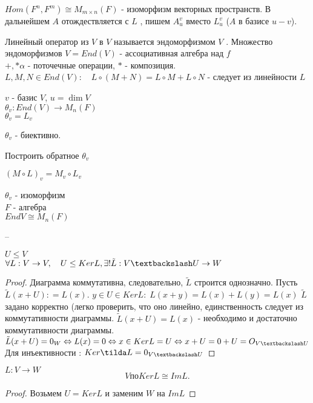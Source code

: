 \documentclass[12pt]{report}
\begin{document}
$Hom (F^n , F^m ) \cong M_{m\times n} (F)$ - изоморфизм векторных пространств.
В дальнейшем $A$ отождествляется с $L$ , пишем $A_u ^v $ вместо $L_u ^v$ ($A$ в базисе $u-v$). 
\begin{defn}
Линейный оператор  из $V $ в  $V$ называется эндоморфизмом $V$ .
Множество эндоморфизмов $V = End(V)$ - ассоциативная алгебра над $f$\\
$+, *\alpha$ - поточечные операции, $*$ - композиция.\\
$L, M, N \in End(V): \quad L\circ (M + N) = L \circ M + L \circ N$ - следует из линейности  $L$
\end{defn}
$v$  - базис $V$, $u = \dim V$ \\
$\theta _v : End(V) \to M_n (F)$ \\
$\theta _v = L_v$
\begin{st}
    $\theta_v$ -  биективно.
\end{st}
\begin{probl}
    Построить обратное $\theta_v$
\end{probl}

\begin{lm}
    $(M \circ L)_v = M_v \circ L_v$
\end{lm}
 \begin{st}
     $\theta _v$ - изоморфизм \\ $F$ - алгебра \\ $End V \cong M_n(F)$
\end{st}

--

\begin{thm}
    $U \le V$ \\
    $\forall L: V \to V, \quad U \le Ker L, \exists ! \tilde L : V \textbackslash U \to W $
\end{thm}
\begin{proof}
    Диаграмма коммутативна, следовательно, $\tilde L$ строится однозначно. Пусть $\tilde L(x + U) : = L(x)$.%
    $y \in U \in Ker L: \; L(x + y) = L(x) + L(y) = L(x)$
    $\tilde L$ задано корректно (легко проверить, что оно линейно, единственность следует из коммутативности диаграммы.
    $\tilde L(x + U) = L(x) $ - необходимо и достаточно коммутативности диаграммы.\\
    $\tilde L(x +U)=0_W \Leftrightarrow L(x) = 0 \Leftrightarrow x \in Ker L = U \Leftrightarrow x + U = 0 +U = O_{V \textbackslash U}$
    \\
    Для инъективности : $ Ker \tilda L = 0_{V \textbackslash U}$
\end{proof}
\begin{thm}[О гомоморфизме]
    $L : V \to W$
     \[
    V по Ker L \cong Im L
    .\] 
\end{thm}
\begin{proof}
    Возьмем $U = Ker L$ и заменим $W$ на $Im L$
\end{proof}
\end{document}
